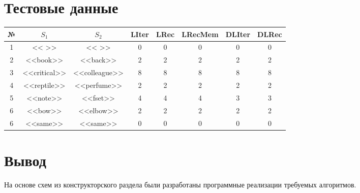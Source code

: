 \section{Тестовые данные}

\begin{table}[h!]
	\begin{center}
		
		\begin{tabular}{||c c c | c c c c c||} 
			\hline
			№ & $S_1$ & $S_2$ & LIter & LRec & LRecMem & DLIter & DLRec \\ [0.5ex] 
			\hline\hline
			1 & << >> & << >> & 0 & 0 & 0 & 0 & 0 \\ 
			2 & <<book>> & <<back>> & 2 & 2 & 2 & 2 & 2 \\ 
			3 & <<critical>> & <<colleague>> & 8 & 8 & 8 & 8 & 8 \\ 
			4 & <<reptile>> & <<perfume>> & 2 & 2 & 2 & 2 & 2 \\ 
			5 & <<note>> & <<fset>> & 4 & 4 & 4 & 3 & 3 \\
			6 & <<bow>> & <<elbow>> & 2 & 2 & 2 & 2 & 2 \\   
			6 & <<same>> & <<same>> & 0 & 0 & 0 & 0 & 0 \\   
			\hline
		\end{tabular}
	\end{center}
\end{table}

\section{Вывод}
На основе схем из конструкторского раздела были разработаны программные реализации требуемых алгоритмов.